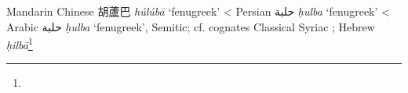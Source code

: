 \begin{etymology}\label{ety:huluba}
Mandarin Chinese {胡蘆巴} \textit{húlúbā} `fenugreek'
< Persian {حلبة} \textit{ḥulba} `fenugreek'
< Arabic {حلبة} \textit{ḥulba} `fenugreek', Semitic; cf. cognates Classical Syriac ; Hebrew  \textit{ḥilbā}\footnote{}
\end{etymology}
